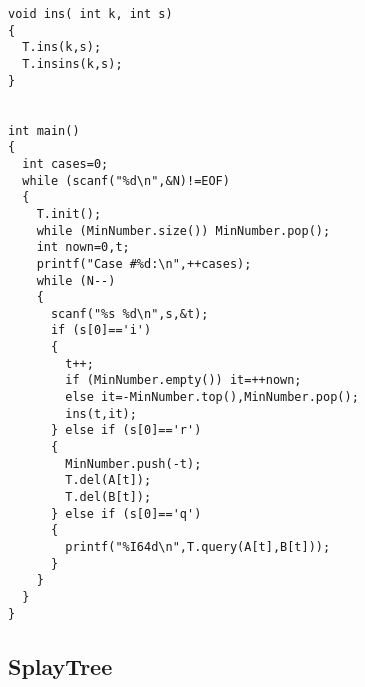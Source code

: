 \begin{lstlisting}[language={}]
void ins( int k, int s)
{
  T.ins(k,s);
  T.insins(k,s);
}


int main()
{
  int cases=0;
  while (scanf("%d\n",&N)!=EOF)
  {
    T.init();
    while (MinNumber.size()) MinNumber.pop();
    int nown=0,t;
    printf("Case #%d:\n",++cases);
    while (N--)
    {
      scanf("%s %d\n",s,&t);
      if (s[0]=='i')
      {
        t++;
        if (MinNumber.empty()) it=++nown;
        else it=-MinNumber.top(),MinNumber.pop();
        ins(t,it);
      } else if (s[0]=='r') 
      {
        MinNumber.push(-t);
        T.del(A[t]);
        T.del(B[t]);
      } else if (s[0]=='q')
      {
        printf("%I64d\n",T.query(A[t],B[t]));
      }
    }
  }
}
\end{lstlisting}
\subsection{SplayTree~}
